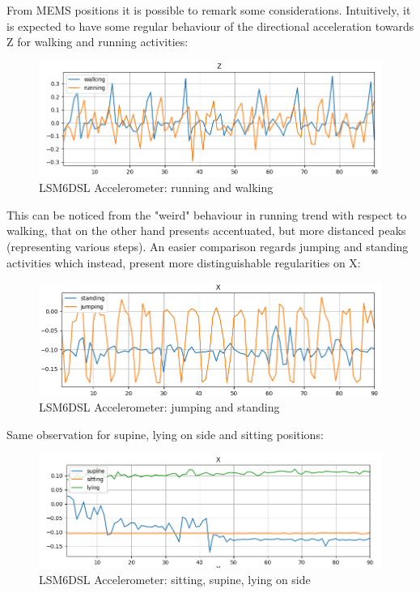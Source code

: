 From MEMS positions it is possible to remark some considerations. Intuitively, it is expected to have some regular behaviour of the directional acceleration towards Z for walking and running activities:
\begin{figure}[H]
		\hfill\includegraphics[scale=0.8]{figures/plot_ACC_LSM6DSL_DS_walking_running_Z.png}\hspace*{\fill}
		\caption{LSM6DSL Accelerometer: running and walking}\label{fig:5}
		\centering
\end{figure}
This can be noticed from the "weird" behaviour in running trend with respect to walking, that on the other hand presents accentuated, but more distanced peaks (representing various steps).\newline
An easier comparison regards jumping and standing activities which instead, present more distinguishable regularities on X:
\begin{figure}[H]
		\hfill\includegraphics[scale=0.8]{figures/plot_ACC_LSM6DSL_DS_standing_jumping_X.png}\hspace*{\fill}
		\caption{LSM6DSL Accelerometer: jumping and standing}\label{fig:6}
		\centering
\end{figure} 
Same observation for supine, lying on side and sitting positions:
\begin{figure}[H]
	\hfill\includegraphics[scale=0.8]{figures/plot_ACC_LSM6DSL_DS_supine_sitting_lying_X.png}\hspace*{\fill}
	\caption{LSM6DSL Accelerometer: sitting, supine, lying on side}\label{fig:7}
	\centering
\end{figure} 
